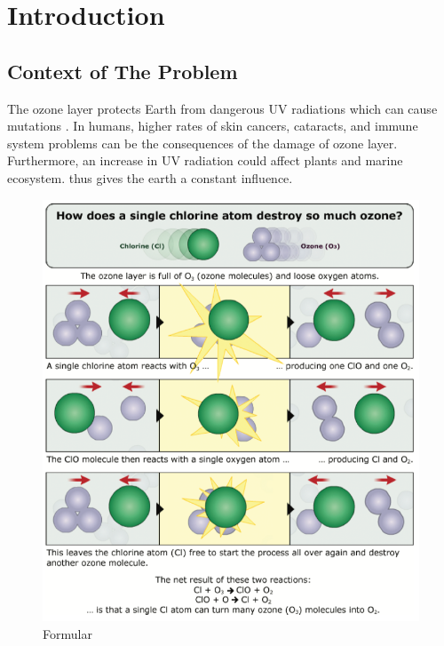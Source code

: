 \documentclass[12pt]{article}
\begin{document}
\newcommand{\vw}{\frac{v_i}{\omega_i}}

\section{Introduction}
\subsection{Context of The Problem}

The ozone layer protects Earth from dangerous UV radiations which can cause mutations . In humans, higher rates of skin cancers, cataracts, and immune system problems can be the consequences of the damage of ozone layer. Furthermore, an increase in UV radiation could affect plants and marine ecosystem. thus gives the earth a constant influence. 

\begin{center}
\begin{figure}[htpb]
\centering
\includegraphics[scale=0.8]{Formular}
\caption{Formular}\label{fig:Formular}
\end{figure}
\end{center}
\end{document}
